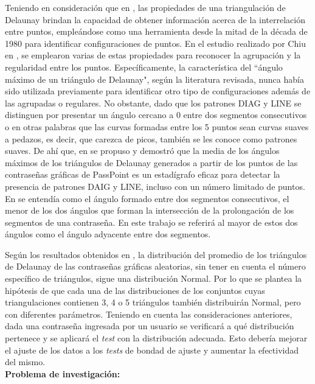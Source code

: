 \documentclass[12pt]{report}
\begin{document}
	Teniendo en consideración que en \cite{12}, las propiedades de una triangulación de Delaunay brindan la capacidad de obtener información acerca de la interrelación entre puntos, empleándose como una herramienta desde la mitad de la década de 1980 para identificar configuraciones de puntos. En el estudio realizado por Chiu en \cite{12}, se emplearon varias de estas propiedades para reconocer la agrupación y la regularidad entre los puntos. Específicamente, la característica del ``ángulo máximo de un triángulo de Delaunay", según la literatura revisada, nunca había sido utilizada previamente para identificar otro tipo de configuraciones además de las agrupadas o regulares. No obstante, dado que los patrones DIAG y LINE se distinguen por presentar un ángulo cercano a 0{\degree } entre dos segmentos consecutivos o en otras palabras que las curvas formadas entre los 5 puntos sean curvas suaves a pedazos, es decir, que carezca de picos, también se les conoce como patrones suaves.  De ahí que, en \cite{13} se propuso y demostró que la media de los ángulos máximos de los triángulos de Delaunay generados a partir de los puntos de las contraseñas gráficas de PassPoint es un estadígrafo eficaz para detectar la presencia de patrones DAIG y LINE, incluso con un número limitado de puntos. En \cite{5} se entendía como el ángulo formado entre dos segmentos consecutivos, el menor de los dos ángulos que forman la intersección de la prolongación de los segmentos de una contraseña. En este trabajo se referirá al mayor de estos dos ángulos como el ángulo adyacente entre dos segmentos.


	
	Según los resultados obtenidos en \cite{13}, la distribución del promedio de los triángulos de  Delaunay de las contraseñas gráficas aleatorias, sin tener en cuenta el número específico de triángulos, sigue una distribución Normal. Por lo que se plantea la hipótesis de que cada una de las distribuciones de los conjuntos cuyas triangulaciones contienen 3, 4 o 5 triángulos también distribuirán Normal, pero con diferentes parámetros. Teniendo en cuenta las consideraciones anteriores, dada una contraseña ingresada por un usuario se verificará a qué distribución pertenece y se aplicará el \textit{test} con la distribución adecuada. Esto debería mejorar el ajuste de los datos a los \textit{tests} de bondad de ajuste y aumentar la efectividad del mismo.\\
	
\large{\textbf{Problema de investigación:}}	
\end{document}
